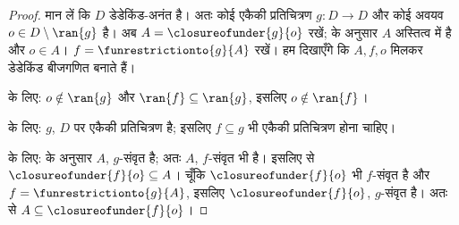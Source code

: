 \documentclass[../../../include/open-logic-section]{subfiles}
\begin{document}
\begin{proof}
मान लें कि $D$ डेडेकिंड-अनंत है। अतः कोई एकैकी प्रतिचित्रण $g \colon D \to
D$ और कोई अवयव $o  \in D \setminus \ran{g}$ है। अब $A =
\closureofunder{g}{o}$ रखें;  के अनुसार $A$ अस्तित्व
में है और $o \in A$। $f =
\funrestrictionto{g}{A}$ रखें। हम दिखाएँगे कि $A, f, o$ मिलकर डेडेकिंड
बीजगणित बनाते हैं।

 के लिए: $o \notin \ran{g}$ और $\ran{f}
\subseteq \ran{g}$, इसलिए $o\notin \ran{f}$।

 के लिए: $g$, $D$ पर एकैकी प्रतिचित्रण है; इसलिए $f
\subseteq g$ भी एकैकी प्रतिचित्रण होना चाहिए।

 के लिए:  के अनुसार $A$,
$g$-संवृत है; अतः $A$, $f$-संवृत भी है। इसलिए
 से $\closureofunder{f}{o} \subseteq A$। चूँकि
$\closureofunder{f}{o}$ भी $f$-संवृत है और $f = \funrestrictionto{g}{A}$,
इसलिए $\closureofunder{f}{o}$, $g$-संवृत है। अतः
 से $A \subseteq \closureofunder{f}{o}$।
\end{proof}
\end{document}
